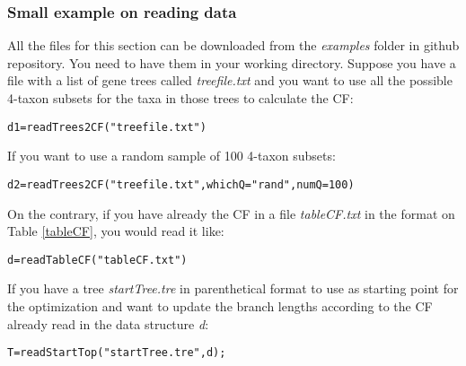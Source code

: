 \documentclass[12pt]{article}
\begin{document}
\subsubsection{Small example on reading data}
\label{readDataEx}
All the files for this section can be downloaded from the
\textit{examples} folder in github repository. You need to have them
in your working directory.
Suppose you have a file with a list of gene trees called
\textit{treefile.txt} and you want to use all the possible 4-taxon subsets for the
taxa in those trees to calculate the CF:
\begin{lstlisting}
d1=readTrees2CF("treefile.txt")
\end{lstlisting}
If you want to use a random sample of 100 4-taxon subsets:
\begin{lstlisting}
d2=readTrees2CF("treefile.txt",whichQ="rand",numQ=100)
\end{lstlisting}
On the contrary, if you have already the CF in a file \textit{tableCF.txt}
in the format on Table \ref{tableCF}, you
would read it like:
\begin{lstlisting}
d=readTableCF("tableCF.txt")
\end{lstlisting}
If you have a tree \textit{startTree.tre} in parenthetical format to
use as starting point for the optimization and want to
update the branch lengths according to the CF already read in the data
structure \textit{d}:
\begin{lstlisting}
T=readStartTop("startTree.tre",d);
\end{lstlisting}
\end{document}
